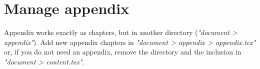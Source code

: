 \chapter{Manage appendix}\label{manage_appendix}
Appendix works exactly as chapters, but in another directory (\textit{"document > appendix"}). Add new appendix chapters in \textit{"document > appendix > appendix.tex"} or, if you do not need an appendix, remove the directory and the inclusion in \textit{"document > content.tex"}.

